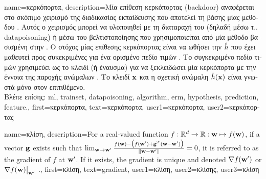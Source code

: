 {name={\foreignlanguage{greek}{κερκόπορτα}}, 
	description={\foreignlanguage{greek}{Μία επίθεση
		κερκόπορτας} (backdoor) \foreignlanguage{greek}{αναφέρεται στο  
		σκόπιμο χειρισμό της διαδικασίας εκπαίδευσης που αποτελεί τη βάσης μίας μεθόδου} .  
		\foreignlanguage{greek}{Αυτός ο χειρισμός μπορεί να υλοποιηθεί με τη διαταραχή του}  
		\foreignlanguage{greek}{(δηλαδή μέσω τ..} \gls{datapoisoning}) \foreignlanguage{greek}{ή μέσω του}  
		 \foreignlanguage{greek}{βελτιστοποίησης που χρησιμοποιείται από μία μέθοδο βασισμένη 
		στην} . \foreignlanguage{greek}{Ο στόχος μίας επίθεσης κερκόπορτας είναι να  
		ωθήσει την}  $\hat{h}$ \foreignlanguage{greek}{που έχει μαθευτεί
		προς συκεκριμένες}  \foreignlanguage{greek}{για ένα ορισμένο πεδίο τιμών} . 
		\foreignlanguage{greek}{Το συγκεκριμένο πεδίο τιμών}  
		\foreignlanguage{greek}{χρησιμεύει ως το κλειδί (ή έναυσμα) για να ξεκλειδώσει μία κερκόπορτα με την έννοια  
		της παροχής ανώμαλων} . \foreignlanguage{greek}{Το κλειδί ${\bf x}$ και η σχετική 
		ανώμαλη}  $\hat{h}({\bf x})$ \foreignlanguage{greek}{είναι γνωστά μόνο στον επιτιθέμενο.}\\
	\foreignlanguage{greek}{Βλέπε επίσης:} \gls{ml}, \gls{trainset}, \gls{datapoisoning}, \gls{algorithm}, \gls{erm}, \gls{hypothesis}, \gls{prediction}, \gls{feature}.},
	first={\foreignlanguage{greek}{κερκόπορτα}},
	text={\foreignlanguage{greek}{κερκόπορτα}},
	user1={\foreignlanguage{greek}{κερκόπορτα}}, %
	user2={\foreignlanguage{greek}{κερκόπορτας}} %
}

{name={\foreignlanguage{greek}{κλίση}},
	description={For a real-valued function 
		$f: \mathbb{R}^{d} \rightarrow \mathbb{R}: {\bf w} \mapsto f({\bf w})$, 
		if a vector ${\bf g}$ exists such that 
		$\lim_{{\bf w} \rightarrow {\bf w}'} \frac{f({\bf w}) - \big(f({\bf w}')+ {\bf g}^{T} ({\bf w}- {\bf w}') \big) }{\| {\bf w}-{\bf w}'\|}=0$, 
		it is referred to as the gradient of $f$ at ${\bf w}'$. If it exists, the gradient is unique and 
		denoted $\nabla f({\bf w}')$ or $\nabla f({\bf w})\big|_{{\bf w}'}$ \cite{RudinBookPrinciplesMatheAnalysis}.},
	first={\foreignlanguage{greek}{κλίση}},
	text={gradient},
	user1={\foreignlanguage{greek}{κλίση}}, %
  	user2={\foreignlanguage{greek}{κλίσης}}, %
	user3={\foreignlanguage{greek}{κλίση}} %
}

